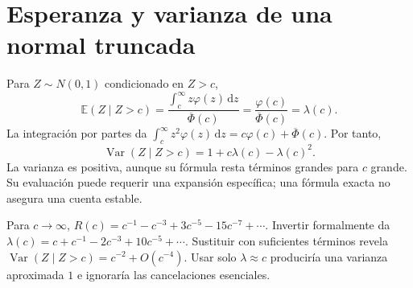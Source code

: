 \documentclass[11pt,a4paper]{article}
\newcommand{\E}{\mathbb E}
\newcommand{\dd}{\,\mathrm d}
\DeclareMathOperator{\Var}{Var}
\theoremstyle{definition}
\newcommand{\SF}{\overline\Phi}
\begin{document}
\section{Esperanza y varianza de una normal truncada}
Para $Z\sim N(0,1)$ condicionado en $Z>c$,
\[
\E(Z\mid Z>c)=\frac{\int_c^\infty z\varphi(z)\dd z}{\SF(c)}
=\frac{\varphi(c)}{\SF(c)}=\lambda(c).
\]
La integración por partes da
$\int_c^\infty z^2\varphi(z)\dd z=c\varphi(c)+\SF(c)$.
Por tanto,
\[
\Var(Z\mid Z>c)=1+c\lambda(c)-\lambda(c)^2.
\]
La varianza es positiva, aunque su fórmula resta términos grandes para $c$ grande. Su evaluación puede requerir una expansión específica; una fórmula exacta no asegura una cuenta estable.

Para $c\to\infty$,
$R(c)=c^{-1}-c^{-3}+3c^{-5}-15c^{-7}+\cdots$.
Invertir formalmente da
$\lambda(c)=c+c^{-1}-2c^{-3}+10c^{-5}+\cdots$.
Sustituir con suficientes términos revela
$\Var(Z\mid Z>c)=c^{-2}+O(c^{-4})$.
Usar solo $\lambda\approx c$ produciría una varianza aproximada $1$ e ignoraría las cancelaciones esenciales.
\end{document}
